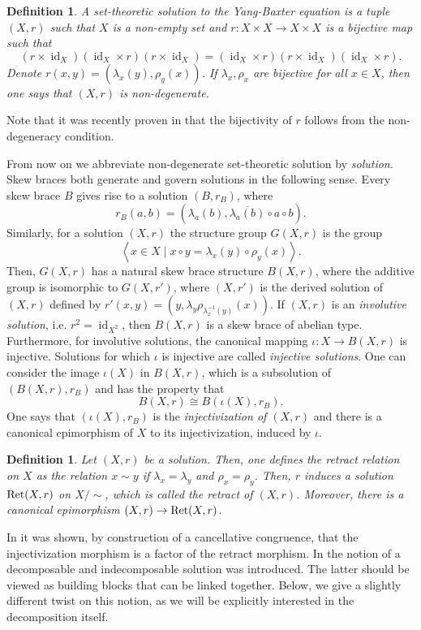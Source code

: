 \documentclass{amsart}
\newcommand{\id}{\operatorname{id}}
\newtheorem{defn}[thm]{Definition}
\begin{document}
 \begin{defn}
     A set-theoretic solution to the Yang-Baxter equation is a tuple $(X,r)$ such that $X$ is a non-empty set and $r\colon X \times X \rightarrow X \times X$ is a bijective map such that $$ (r \times \id_X)(\id_X \times r)( r \times \id_X) = (\id_X \times r)(r \times \id_X)(\id_X\times r).$$  Denote $r(x,y) = (\lambda_x(y),\rho_y(x))$. If $\lambda_x,\rho_x$ are bijective for all $x \in X$, then one says that $(X,r)$ is non-degenerate. 
 \end{defn}
Note that it was recently proven in \cite{MR5009092} that
the bijectivity of $r$ follows from the non-degeneracy condition.

From now on we abbreviate non-degenerate set-theoretic solution by {\it solution}. Skew braces both generate and govern solutions in the following sense. Every skew brace $B$ gives rise to a solution $(B,r_B)$, where 
\[
r_B(a,b) = ( \lambda_a(b), \overline{\lambda_a(b)}\circ a \circ b).
\]
Similarly, for a solution $(X,r)$ the structure group $G(X,r)$ is the group
$$ \left< x \in X \mid x\circ y = \lambda_x(y) \circ \rho_y(x)\right>.$$ 
Then, $G(X,r)$ has a natural skew brace structure $B(X,r)$, 
where the additive group is isomorphic to $G(X,r')$, 
where $(X,r')$ is the derived solution of $(X,r)$ 
defined by $r'(x,y) = (y, \lambda_{y}\rho_{\lambda_x^{-1}(y)}(x))$.
If $(X,r)$ is an \emph{involutive solution}, i.e. $r^2=\id_{X^2}$,
then $B(X,r)$ is a skew brace of abelian type. 
Furthermore, for involutive solutions, the canonical mapping $\iota :X \rightarrow B(X,r)$ is injective.
Solutions for which $\iota$ is injective are called \textit{injective solutions}.
One can consider the image $\iota(X)$ in $B(X,r)$, which is a subsolution of $(B(X,r),r_B)$
and has the property that 
$$ B(X,r) \cong B(\iota(X),r_B).$$
One says that $(\iota(X),r_B)$ is the \emph{injectivization of $(X,r)$}
and there is a canonical epimorphism of $X$ to its injectivization, induced by $\iota$.

\begin{defn}
    Let $(X,r)$ be a solution. Then, one defines the \emph{retract relation on $X$}
    as the relation $x \sim y$ if $\lambda_x=\lambda_y$ and $\rho_x=\rho_y$. 
    Then, $r$ induces a solution $\textup{Ret}(X,r)$ on $X/\sim$, which is called the \emph{retract of $(X,r)$}. Moreover, there is a canonical epimorphism $(X,r) \rightarrow \textup{Ret}(X,r)$.
\end{defn}
In \cite{jespers2019structure} it was shown, by construction of a cancellative congruence, 
that the injectivization morphism is a factor of the retract morphism. 
In \cite{MR1722951} the notion of a decomposable and indecomposable solution was introduced.
The latter should be viewed as building blocks that can be linked together. 
Below, we give a slightly different twist on this notion,
as we will be explicitly interested in the decomposition itself.
\end{document}
